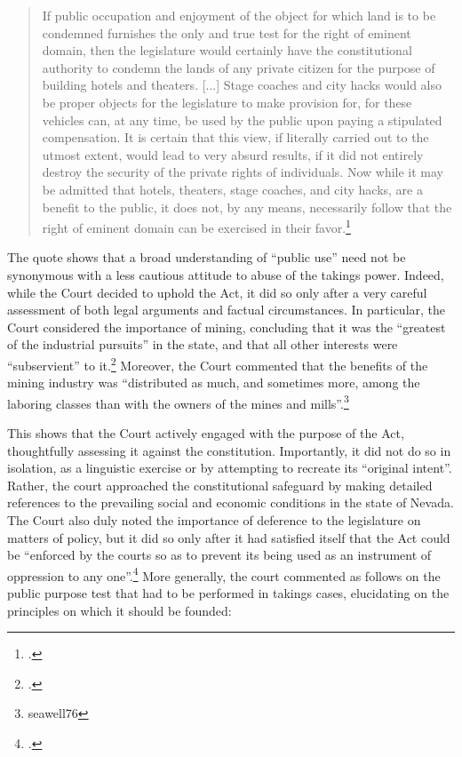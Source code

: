 \begin{quote}
If public occupation and enjoyment of the object for which land is to be condemned furnishes the only and true test for the right of eminent domain, then the legislature would certainly have the constitutional authority to condemn the lands of any private citizen for the purpose of building hotels and theaters. [...] Stage coaches and city hacks would also be proper objects for the legislature to make provision for, for these vehicles can, at any time, be used by the public upon paying a stipulated compensation. It is certain that this view, if literally carried out to the utmost extent, would lead to very absurd results, if it did not entirely destroy the security of the private rights of individuals. Now while it may be admitted that hotels, theaters, stage coaches, and city hacks, are a benefit to the public, it does not, by any means, necessarily follow that the right of eminent domain can be exercised in their favor.\footcite[410-411]{seawell76}
\end{quote}

The quote shows that a broad understanding of ``public use'' need not be synonymous with a less cautious attitude to abuse of the takings power. Indeed, while the Court decided to uphold the Act, it did so only after a very careful assessment of both legal arguments and factual circumstances. In particular, the Court considered the importance of mining, concluding that it was the ``greatest of the industrial pursuits'' in the state, and that all other interests were ``subservient'' to it.\footcite[409]{seawell76} Moreover, the Court commented that the benefits of the mining industry was ``distributed as much, and sometimes more, among the laboring classes than with the owners of the mines and mills''.\footnote[409]{seawell76}

This shows that the Court actively engaged with the purpose of the Act, thoughtfully assessing it against the constitution. Importantly, it did not do so in isolation, as a linguistic exercise or by attempting to recreate its ``original intent''. Rather, the court approached the constitutional safeguard by making detailed references to the prevailing social and economic conditions in the state of Nevada. The Court also duly noted the importance of deference to the legislature on matters of policy, but it did so only after it had satisfied itself that the Act could be ``enforced by the courts so as to prevent its being used as an instrument of oppression to any one''.\footcite[412]{seawell76} More generally, the court commented as follows on the public purpose test that had to be performed in takings cases, elucidating on the principles on which it should be founded:

